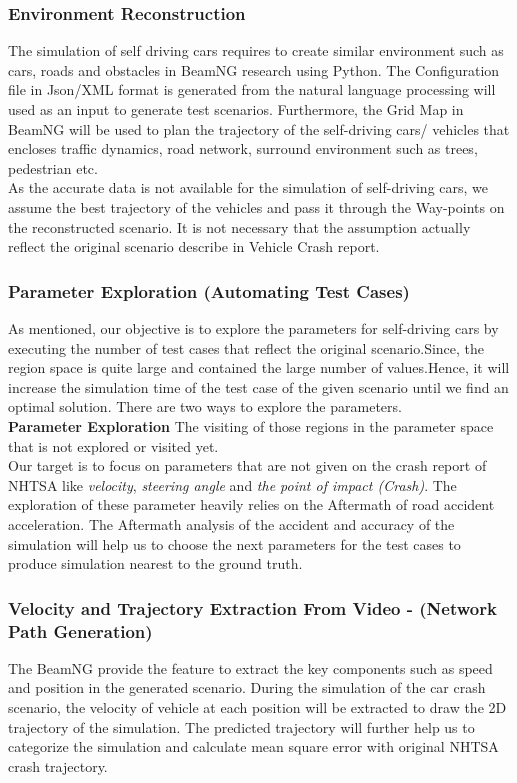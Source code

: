 \subsubsection{Environment Reconstruction}
The simulation of self driving cars requires to create similar environment such as cars, roads and obstacles in BeamNG research using Python. The Configuration file in Json/XML format is generated from the natural language processing will used as an input to generate test scenarios. Furthermore, the Grid Map in BeamNG will be used to plan the trajectory of the self-driving cars/ vehicles that encloses traffic dynamics, road network, surround environment such as trees, pedestrian etc. \\
As the accurate data is not available for the simulation of self-driving cars, we assume the best trajectory of the vehicles and pass it through the Way-points on the reconstructed scenario. It is not necessary that the assumption actually reflect the original scenario describe in Vehicle Crash report.

\subsubsection{Parameter Exploration (Automating Test Cases)}
As mentioned, our objective is to explore the parameters for self-driving cars by executing the number of test cases that reflect the original scenario.Since, the region space is quite large and contained the large number of values.Hence, it will increase the simulation time of the test case of the given scenario until we find an optimal solution. There are two ways to explore the parameters.\\ 

\textbf{Parameter Exploration} The visiting of those regions in the parameter space that is not explored or visited yet.\\ 

Our target is to focus on parameters that are not given on the crash report of NHTSA like \textit{velocity}, \textit{steering angle} and \textit{the point of impact (Crash)}. The exploration of these parameter heavily relies on the Aftermath of road accident acceleration. The Aftermath analysis of the accident and accuracy of the simulation will help us to choose the next parameters for the test cases to produce simulation nearest to the ground truth. 

\subsubsection{Velocity and Trajectory Extraction From Video - (Network Path Generation)}
The BeamNG provide the feature to extract the key components such as speed and position in the generated scenario. During the simulation of the car crash scenario, the velocity of vehicle at each position will be extracted to draw the 2D trajectory of the simulation. The predicted trajectory will further help us to categorize the simulation and calculate mean square error with original NHTSA crash trajectory.  

